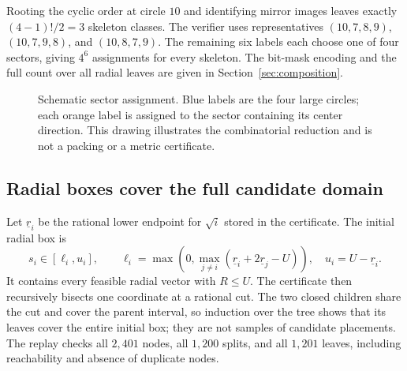 \documentclass[11pt,a4paper]{article}
\theoremstyle{remark}
\begin{document}
Rooting the cyclic order at circle $10$ and identifying mirror images leaves
exactly $(4-1)!/2=3$ skeleton classes.  The verifier uses representatives
$(10,7,8,9)$, $(10,7,9,8)$, and $(10,8,7,9)$.  The remaining six labels each
choose one of four sectors, giving $4^6$ assignments for every skeleton.
The bit-mask encoding and the full count over all radial leaves are given in
Section~\ref{sec:composition}.

\begin{figure}[ht]
\centering
{}
\caption{Schematic sector assignment. Blue labels are the four large
circles; each orange label is assigned to the sector containing its center
direction. This drawing illustrates the combinatorial reduction and is not a
packing or a metric certificate.}
\label{fig:four-sectors}
\end{figure}

\subsection{Radial boxes cover the full candidate domain}
\label{sec:radial-tree}

Let $\underline r_i$ be the rational lower endpoint for $\sqrt{i}$ stored
in the certificate.  The initial radial box is
\begin{equation}
  s_i\in[\ell_i,u_i],\qquad
  \ell_i=\max\!\left(0,\max_{j\ne i}
       (\underline r_i+2\underline r_j-U)\right),\quad
  u_i=U-\underline r_i.
  \label{eq:initial-radial-box}
\end{equation}
It contains every feasible radial vector with $R\le U$.  The certificate
then recursively bisects one coordinate at a rational cut.  The two closed
children share the cut and cover the parent interval, so induction over the
tree shows that its leaves cover the entire initial box; they are not samples
of candidate placements.  The replay checks all $2{,}401$ nodes, all $1{,}200$
splits, and all $1{,}201$ leaves, including reachability and absence of
duplicate nodes.
\end{document}
